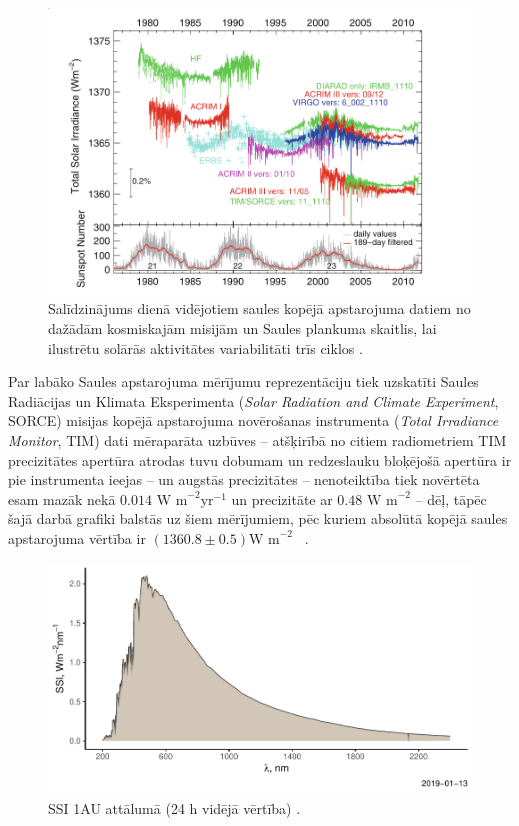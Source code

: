 \begin{figure}[h]
    \centering
    \includegraphics[width=\linewidth]{figures/misc/TSI_misijas.png}
    \caption{Salīdzinājums dienā vidējotiem saules kopējā apstarojuma datiem no dažādām kosmiskajām misijām un Saules plankuma skaitlis, lai ilustrētu solārās aktivitātes variabilitāti trīs ciklos \cite{Frohlich2012}.}
    \label{fig:TSI_misijas}
\end{figure}

Par labāko Saules apstarojuma mērījumu reprezentāciju tiek uzskatīti Saules Radiācijas un Klimata Eksperimenta (\textit{Solar Radiation and Climate Experiment}, SORCE) misijas kopējā apstarojuma novērošanas instrumenta (\textit{Total Irradiance Monitor}, TIM)  dati mēraparāta uzbūves -- atšķirībā no citiem radiometriem TIM precizitātes apertūra atrodas tuvu dobumam un redzeslauku bloķējošā apertūra ir pie instrumenta ieejas -- un augstās precizitātes -- nenoteiktība tiek novērtēta esam mazāk nekā $0.014$ $\textrm{W  m}^{-2}\textrm{yr}^{-1}$ un precizitāte ar $0.48$ $\textrm{W  m}^{-2}$ \cite{TSIdata} -- dēļ, tāpēc šajā darbā grafiki balstās uz šiem mērījumiem, pēc kuriem absolūtā kopējā saules apstarojuma vērtība ir $(1360.8 \pm 0.5) \textrm{W m}^{-2}$ ~\cite{Frohlich2012}.

\begin{figure}[h]
    \centering
    \includegraphics[width=\linewidth]{figures/misc/SSI.pdf}
    \caption{SSI 1AU attālumā (24 h vidējā vērtība) \cite{SSIdata}.}
    \label{fig:SSI}
\end{figure}

